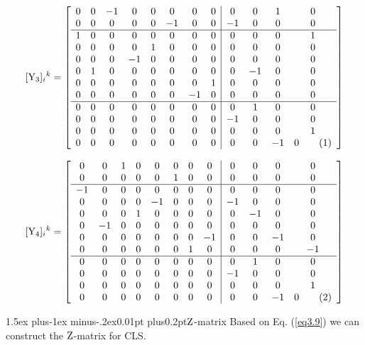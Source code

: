 \documentclass[12pt]{article}
\makeatletter
\newcommand\numberthis{\addtocounter{equation}{1}\tag{\theequation}}
\let\bm\relax
\newcommand{\bm}[1]{{\boldsymbol{#1}}}
\def\subsubsection{\@startsection{subsubsection}{3}{\z@}
          {1.5ex plus-1ex minus-.2ex}{0.01pt plus0.2pt}{\sf\boldmath}}
\makeatother
\begin{document}
\[[{\bm{\rm Y}_3}]_{i}{}^{k}= 
\left[\begin{array}{cccccccc|cccc}
 0 & 0 & -1 & 0 & 0 & 0 & 0 & 0 & 0 & 0 & 1 & 0 \\
 0 & 0 & 0 & 0 & 0 & -1 & 0 & 0 & -1 & 0 & 0 & 0 \\
  \hline
 1 & 0 & 0 & 0 & 0 & 0 & 0 & 0 & 0 & 0 & 0 & 1 \\
 0 & 0 & 0 & 0 & 1 & 0 & 0 & 0 & 0 & 0 & 0 & 0 \\
 0 & 0 & 0 & -1 & 0 & 0 & 0 & 0 & 0 & 0 & 0 & 0 \\
 0 & 1 & 0 & 0 & 0 & 0 & 0 & 0 & 0 & -1 & 0 & 0 \\
 0 & 0 & 0 & 0 & 0 & 0 & 0 & 1 & 0 & 0 & 0 & 0 \\
 0 & 0 & 0 & 0 & 0 & 0 & -1 & 0 & 0 & 0 & 0 & 0 \\
  \hline
 0 & 0 & 0 & 0 & 0 & 0 & 0 & 0 & 0 & 1 & 0 & 0 \\
 0 & 0 & 0 & 0 & 0 & 0 & 0 & 0 & -1 & 0 & 0 & 0 \\
 0 & 0 & 0 & 0 & 0 & 0 & 0 & 0 & 0 & 0 & 0 & 1 \\
 0 & 0 & 0 & 0 & 0 & 0 & 0 & 0 & 0 & 0 & -1 & 0
\numberthis\end{array}\right] \]

\[[{\bm{\rm Y}_4}]_{i}{}^{k}= 
\left[\begin{array}{cccccccc|cccc}
 0 & 0 & 1 & 0 & 0 & 0 & 0 & 0 & 0 & 0 & 0 & 0 \\
 0 & 0 & 0 & 0 & 0 & 1 & 0 & 0 & 0 & 0 & 0 & 0 \\
 \hline
 -1 & 0 & 0 & 0 & 0 & 0 & 0 & 0 & 0 & 0 & 0 & 0 \\
 0 & 0 & 0 & 0 & -1 & 0 & 0 & 0 & -1 & 0 & 0 & 0 \\
 0 & 0 & 0 & 1 & 0 & 0 & 0 & 0 & 0 & -1 & 0 & 0 \\
 0 & -1 & 0 & 0 & 0 & 0 & 0 & 0 & 0 & 0 & 0 & 0 \\
 0 & 0 & 0 & 0 & 0 & 0 & 0 & -1 & 0 & 0 & -1 & 0 \\
 0 & 0 & 0 & 0 & 0 & 0 & 1 & 0 & 0 & 0 & 0 & -1 \\
  \hline
 0 & 0 & 0 & 0 & 0 & 0 & 0 & 0 & 0 & 1 & 0 & 0 \\
 0 & 0 & 0 & 0 & 0 & 0 & 0 & 0 & -1 & 0 & 0 & 0 \\
 0 & 0 & 0 & 0 & 0 & 0 & 0 & 0 & 0 & 0 & 0 & 1 \\
 0 & 0 & 0 & 0 & 0 & 0 & 0 & 0 & 0 & 0 & -1 & 0 
\numberthis\end{array}\right] \label{eq512}\]

\subsubsection{$\bm{\rm Z}$-matrix}
Based on Eq. (\ref{eq3.9}) we can construct the $\bm{\rm{Z}}$-matrix for CLS.
\end{document}
